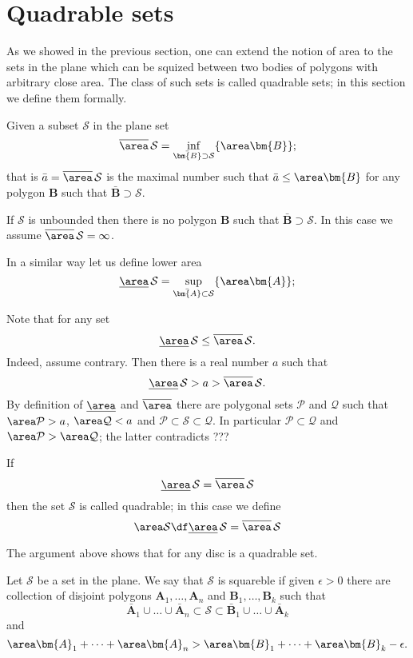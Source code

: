 {\section*{Quadrable sets}

As we showed in the previous section,
one can extend the notion of area to the sets in the plane which can be squized between two bodies of polygons with arbitrary close area.
The class of such sets is called quadrable sets;
in this section we define them formally.

Given a subset  $\mathcal{S}$ in the plane
set
\[\overline\area\,\mathcal{S}=\inf_{\bar{\bm{B}}\supset \mathcal{S}}\{\area\bm{B}\};\]
that is $\bar a=\overline\area\,\mathcal{S}$ is the maximal number such that $\bar a\le \area\bm{B}$ for any polygon $\bm{B}$ such that $\bar{\bm{B}}\supset \mathcal{S}$.

If $\mathcal{S}$ is unbounded
then there is no polygon $\bm{B}$ such that $\bar{\bm{B}}\supset \mathcal{S}$.
In this case we assume $\overline\area\,\mathcal{S}=\infty$.

In a similar way let us define lower area 
\[\underline\area\,\mathcal{S}=\sup_{\bar{\bm{A}}\subset \mathcal{S}}\{\area\bm{A}\};\]

Note that for any set 
\[\underline\area\,\mathcal{S}\le\overline\area\,\mathcal{S}.\]
Indeed, assume contrary. Then there is a real number $a$ such that 
\[\underline\area\,\mathcal{S}>a>\overline\area\,\mathcal{S}.\]
By definition of $\underline\area$ and $\overline\area$ there are 
polygonal sets $\mathcal{P}$ and $\mathcal{Q}$ 
such that $\area\mathcal{P}>a$, $\area \mathcal{Q}<a$
and $\mathcal{P}\subset \mathcal{S}\subset\mathcal{Q}$.
In particular $\mathcal{P}\subset \mathcal{Q}$ 
and $\area\mathcal{P}>\area \mathcal{Q}$;
the latter contradicts ???

If
\[\underline\area\,\mathcal{S}=\overline\area\,\mathcal{S}\]
then the set $\mathcal{S}$ is called quadrable;
in this case we define 
\[\area\mathcal{S}\df\underline\area\,\mathcal{S}=\overline\area\,\mathcal{S}\]

The argument above shows that for any disc is a quadrable set.

Let $\mathcal S$ be a set in the plane.
We say that $\mathcal S$ is squareble if 
given $\epsilon>0$ there are collection of disjoint polygons $\bm{A}_1,\dots, \bm{A}_n$ and $\bm{B}_1,\dots, \bm{B}_k$
such that
\[\bar{\bm{A}}_1\cup\dots\cup\bar{\bm{A}}_n\subset\mathcal S\subset \bar{\bm{B}}_1\cup\dots\cup\bar{\bm{A}}_k\]
and 
\[\area\bm{A}_1+\dots+\area\bm{A}_n
>
\area\bm{B}_1+\dots+\area\bm{B}_k-\epsilon.\]

}
